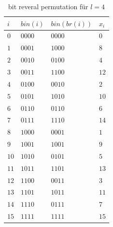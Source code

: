 \documentclass[a4paper,12pt]{article}
\begin{document}
\begin{table}
	\begin{center}
		\begin{tabular}[c]{|l|l|l|l|}
			\hline
			$i$ & $\mathit{bin}\left(i\right)$ &$\mathit{bin}\left(\mathit{br}\left(i\right)\right)$  &$x_i$\\
			\hline
			$0$ & $0000$ &$0000$  &$0$\\
			\hline
			$1$ & $0001$ &$1000$  &$8$\\
			\hline
			$2$ & $0010$ &$0100$  &$4$\\
			\hline
			$3$ & $0011$ &$1100$  &$12$\\
			\hline
			$4$ & $0100$ &$0010$  &$2$\\
			\hline
			$5$ & $0101$ &$1010$  &$10$\\
			\hline
			$6$ & $0110$ &$0110$  &$6$\\
			\hline
			$7$ & $0111$ &$1110$  &$14$\\
			\hline
			$8$ & $1000$ &$0001$  &$1$\\
			\hline
			$9$ & $1001$ &$1001$  &$9$\\
			\hline
			$10$& $1010$ &$0101$  &$5$\\
			\hline
			$11$& $1011$ &$1101$  &$13$\\
			\hline
			$12$ &$1100$ &$0011$  &$3$\\
			\hline
			$13$ &$1101$ &$1011$  &$11$\\
			\hline
			$14$ &$1110$ &$0111$  &$7$\\
			\hline
			$15$ &$1111$ &$1111$  &$15$\\
			\hline
		\end{tabular}
		\caption{bit reveral permutation für $l=4$} 
		\label{tab:bitReversal}
	\end{center}
\end{table}
\end{document}
